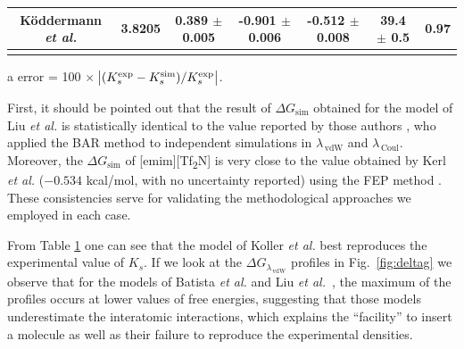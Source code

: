 \documentclass[3p,twocolumn]{elsarticle}
\begin{document}
\begin{table}
\begin{adjustbox}{width=1\textwidth}
\begin{threeparttable}
\begin{tabular}{ c c c  c  c  c  c }
		\hline
 K\"{o}ddermann \textit{et al.} \cite{K_ddermann_2007} &3.8205 & 0.389 $\pm$ 0.005 & -0.901 $\pm$ 0.006& -0.512 $\pm$ 0.008 & 39.4 $\pm$ 0.5  & 0.97  \\
 \bottomrule
\label{table:henry} 
\end{tabular}
\begin{tablenotes}
\item[a] error = 100 $\times$ $\abs{(K_s^{\text{exp}} - K_s^{\text{sim}})/K_s^{\text{exp}}}$.
\end{tablenotes}
\end{threeparttable}
\end{adjustbox}
\end{table}

First, it should be pointed out that the result of $\Delta G_{\text{sim}}$ obtained for the model of Liu \textit{et al.} \cite{Liu_2014} is statistically identical to the value reported by those authors \cite{Liu_2014_1}, who applied the BAR method \cite{Bennett_1976} to independent simulations in $\lambda_{\,\text{vdW}}$ and $\lambda_{\, \text{Coul}}$. Moreover, the $\Delta G_{\text{sim}}$ of [emim][Tf\textsubscript{2}N] is very close to the value obtained by Kerl \textit{et al.} \cite{Kerl__2017} ($-0.534$ kcal/mol, with no uncertainty reported) using the FEP method \cite{Zwanzig_1954}. These consistencies serve for validating the methodological approaches we employed in each case.

From Table \ref{table:henry} one can see that the model of Koller \textit{et al.} \cite{Koller_2012} best reproduces the experimental value of $K_s$. If we look at the $\Delta G_{\lambda_{\,\text{vdW}}}$ profiles in Fig.~\ref{fig:deltag} we observe that for the models of Batista \textit{et al.} \cite{Batista_2015} and Liu \textit{et al.}~\cite{Liu_2014}, the maximum of the profiles occurs at lower values of free energies, suggesting that those models underestimate the interatomic interactions, which explains the ``facility'' to insert a  molecule as well as their failure to reproduce the experimental densities.
\end{document}
